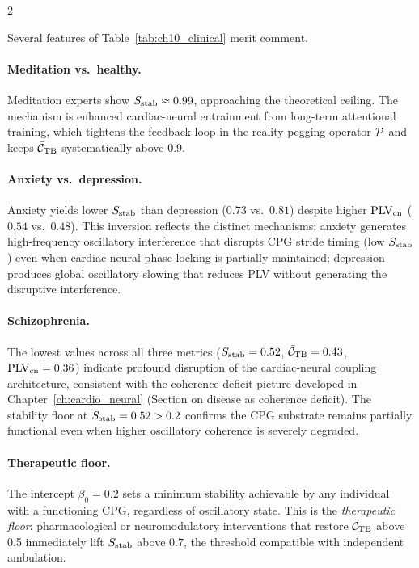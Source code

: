 \begin{multicols}{2}

Several features of Table~\ref{tab:ch10_clinical} merit comment.

\paragraph{Meditation vs.\ healthy.}
Meditation experts show $S_{\mathrm{stab}} \approx 0.99$, approaching the theoretical ceiling. The mechanism is enhanced cardiac-neural entrainment from long-term attentional training, which tightens the feedback loop in the reality-pegging operator $\mathcal{P}$ and keeps $\bar{\mathcal{C}}_{\mathrm{TB}}$ systematically above 0.9.

\paragraph{Anxiety vs.\ depression.}
Anxiety yields lower $S_{\mathrm{stab}}$ than depression ($0.73$ vs.\ $0.81$) despite higher $\mathrm{PLV}_{\mathrm{cn}}$ ($0.54$ vs.\ $0.48$). This inversion reflects the distinct mechanisms: anxiety generates high-frequency oscillatory interference that disrupts CPG stride timing (low $S_{\mathrm{stab}}$) even when cardiac-neural phase-locking is partially maintained; depression produces global oscillatory slowing that reduces PLV without generating the disruptive interference.

\paragraph{Schizophrenia.}
The lowest values across all three metrics ($S_{\mathrm{stab}} = 0.52$, $\bar{\mathcal{C}}_{\mathrm{TB}} = 0.43$, $\mathrm{PLV}_{\mathrm{cn}} = 0.36$) indicate profound disruption of the cardiac-neural coupling architecture, consistent with the coherence deficit picture developed in Chapter~\ref{ch:cardio_neural} (Section on disease as coherence deficit). The stability floor at $S_{\mathrm{stab}} = 0.52 > 0.2$ confirms the CPG substrate remains partially functional even when higher oscillatory coherence is severely degraded.

\paragraph{Therapeutic floor.}
The intercept $\beta_0 = 0.2$ sets a minimum stability achievable by any individual with a functioning CPG, regardless of oscillatory state. This is the \emph{therapeutic floor}: pharmacological or neuromodulatory interventions that restore $\bar{\mathcal{C}}_{\mathrm{TB}}$ above 0.5 immediately lift $S_{\mathrm{stab}}$ above $0.7$, the threshold compatible with independent ambulation.

\end{multicols}

